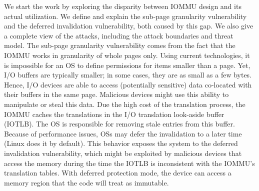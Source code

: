 We start the work by exploring the disparity between IOMMU design and its actual utilization. We define and explain the sub-page granularity vulnerability and the deferred invalidation vulnerability, both caused by this gap. We also give a complete view of the attacks, including the attack boundaries and threat model. The sub-page granularity vulnerability comes from the fact that the IOMMU works in granularity of whole pages only. Using current technologies, it is impossible for an OS to define permissions for items smaller than a page. Yet, I/O buffers are typically smaller; in some cases, they are as small as a few bytes. Hence, I/O devices are able to access (potentially sensitive) data co-located with their buffers in the same page. Malicious devices might use this ability to manipulate or steal this data. Due the high cost of the translation process, the IOMMU caches the translations in the I/O translation look-aside buffer (IOTLB). The OS is responsible for removing stale entries from this buffer. Because of performance issues, OSs may defer the invalidation to a later time (Linux does it by default). This behavior exposes the system to the deferred invalidation vulnerability, which might be exploited by malicious devices that access the memory during the time the IOTLB is inconsistent with the IOMMU’s translation tables. With deferred protection mode, the device can access a memory region that the code will treat as immutable.

